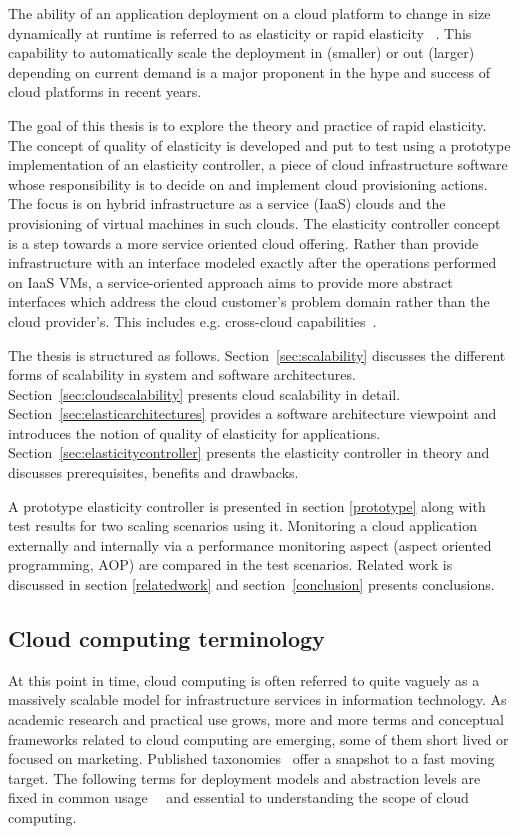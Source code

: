 \documentclass[english]{tktltiki2}
\theoremstyle{definition}
\theoremstyle{remark}
\begin{document}
The ability of an application deployment on a cloud platform to change in size
dynamically at runtime is referred to as elasticity or rapid elasticity
~\cite{nistdefinition}. This capability to automatically scale the deployment in
(smaller) or out (larger) depending on current demand is a major proponent in
the hype and success 
of cloud platforms in recent years.

The goal of this thesis is to explore the theory and practice of rapid
elasticity. The concept of quality of elasticity is developed and put to test
using a prototype implementation of an elasticity controller, a piece of cloud
infrastructure software whose responsibility is to decide on and implement cloud
provisioning actions. The focus is on hybrid infrastructure as a service (IaaS)
clouds and the provisioning of virtual machines in such clouds. The elasticity
controller concept is a step towards a more service oriented cloud offering.
Rather than provide infrastructure with an interface modeled exactly after the
operations performed on IaaS VMs, a service-oriented approach aims to provide
more abstract interfaces which address the cloud customer’s problem domain
rather than the cloud provider’s. This includes e.g. cross-cloud
capabilities~\cite{frominfratoservice}.

The thesis is structured as follows. Section~\ref{sec:scalability} discusses the
different forms of scalability in system and software architectures.
Section~\ref{sec:cloudscalability} presents cloud scalability in detail.
Section~\ref{sec:elasticarchitectures} provides a software architecture viewpoint
and introduces the notion of quality of elasticity for applications.
Section~\ref{sec:elasticitycontroller} presents the elasticity controller in theory
and discusses prerequisites, benefits and drawbacks.

A prototype elasticity controller is presented in section \ref{prototype} along
with test results for two scaling scenarios using it. Monitoring a cloud
application externally and internally via a performance monitoring aspect
(aspect oriented programming, AOP) are compared in the test scenarios. Related
work is discussed in section  \ref{relatedwork} and section~\ref{conclusion}
presents conclusions.

\subsection{Cloud computing terminology} At this point in time, cloud computing
is often referred to quite vaguely as a massively scalable model for
infrastructure services in information technology. As academic research and
practical use grows, more and more terms and conceptual frameworks related to
cloud computing are emerging, some of them short lived or focused on marketing.
Published taxonomies~\cite{Hofer2011taxonomy} offer a snapshot to a fast moving
target. The following terms for deployment models and abstraction levels are
fixed in common usage~\cite{nistdefinition}~\cite{handbook} and essential to
understanding the scope of cloud computing.
\end{document}
